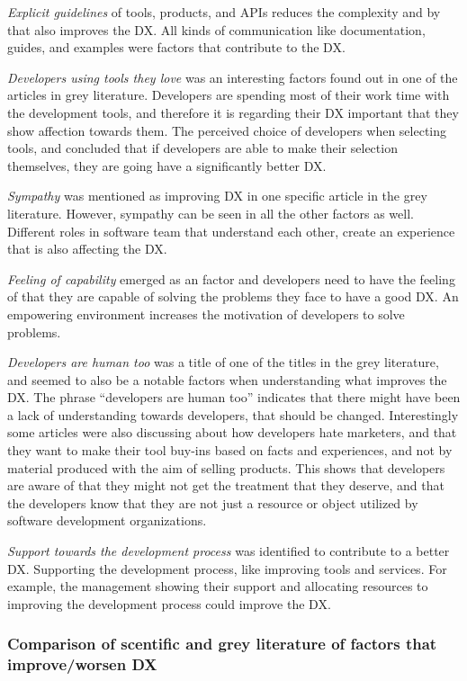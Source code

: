 \documentclass[english, 12pt, a4paper, sci, utf8, a-1b, online]{aaltothesis}
\begin{document}
\textit{Explicit guidelines} of tools, products, and APIs reduces the complexity and by that also improves the DX. All kinds of communication like documentation, guides, and examples were factors that contribute to the DX.

\textit{Developers using tools they love} was an interesting factors found out in one of the articles in grey literature. Developers are spending most of their work time with the development tools, and therefore it is regarding their DX important that they show affection towards them. The perceived choice of developers when selecting tools, and concluded that if developers are able to make their selection themselves, they are going have a significantly better DX.

\textit{Sympathy} was mentioned as improving DX in one specific article in the grey literature. However, sympathy can be seen in all the other factors as well. Different roles in software team that understand each other, create an experience that is also affecting the DX.

\textit{Feeling of capability} emerged as an factor and developers need to have the feeling of that they are capable of solving the problems they face to have a good DX. An empowering environment increases the motivation of developers to solve problems.

\textit{Developers are human too} was a title of one of the titles in the grey literature, and seemed to also be a notable factors when understanding what improves the DX. The phrase ``developers are human too'' indicates that there might have been a lack of understanding towards developers, that should be changed. Interestingly some articles were also discussing about how developers hate marketers, and that they want to make their tool buy-ins based on facts and experiences, and not by material produced with the aim of selling products. This shows that developers are aware of that they might not get the treatment that they deserve, and that the developers know that they are not just a resource or object utilized by software development organizations.

\textit{Support towards the development process} was identified to contribute to a better DX. Supporting the development process, like improving tools and services. For example, the management showing their support and allocating resources to improving the development process could improve the DX.

\subsubsection{Comparison of scentific and grey literature of factors that improve/worsen DX}
\end{document}
